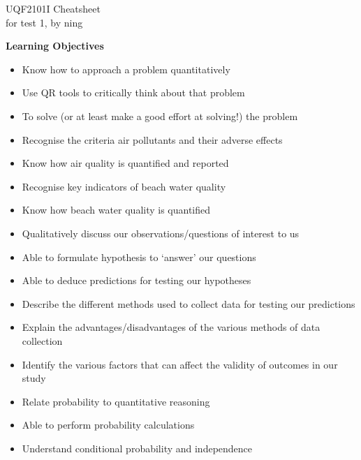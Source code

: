 \documentclass{article}
\newcommand{\headingsmall}[1]{{\small\textbf{#1}}}
\begin{document}
\scriptsize                %
\setlength\parindent{0pt}  %

\begin{center}
{\large UQF2101I Cheatsheet}\\{for test 1, by ning}
\end{center}

\begin{multicols*}{4}

\headingsmall{Learning Objectives}
\begin{itemize} \itemsep -0.5em
    \item Know how to approach a problem quantitatively
    \item Use QR tools to critically think about that problem
    \item To solve (or at least make a good effort at solving!) the problem
    \item Recognise the criteria air pollutants and their adverse effects
    \item Know how air quality is quantified and reported
    \item Recognise key indicators of beach water quality
    \item Know how beach water quality is quantified
    \item Qualitatively discuss our observations/questions of interest to us
    \item Able to formulate hypothesis to `answer' our questions
    \item Able to deduce predictions for testing our hypotheses
    \item Describe the different methods used to collect data for testing 
        our predictions
    \item Explain the advantages/disadvantages of the various methods of
        data collection
    \item Identify the various factors that can affect the validity of outcomes
        in our study
    \item Relate probability to quantitative reasoning
    \item Able to perform probability calculations
    \item Understand conditional probability and independence
\end{itemize}


\end{multicols*}
\end{document}
